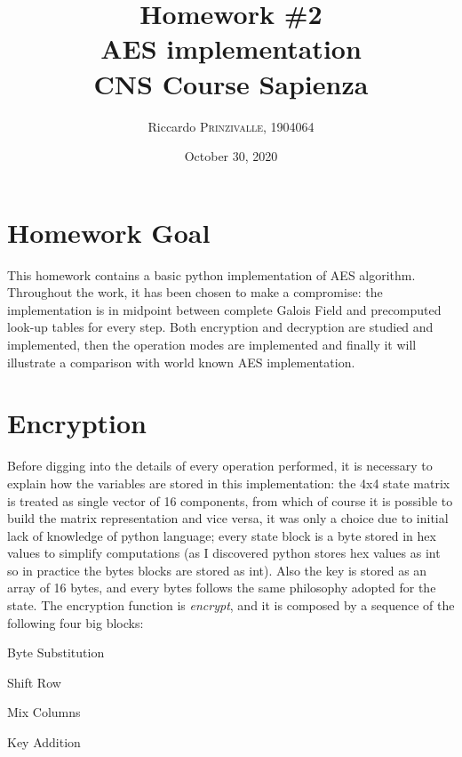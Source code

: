 \documentclass{article}
\title{Homework \#2 \\AES implementation \\[0.2em]\small{}CNS Course Sapienza} %
\author{Riccardo \textsc{Prinzivalle}, 1904064} %
\date{October 30, 2020} %
\begin{document}
\maketitle %


\section{Homework Goal}

This homework contains a basic python implementation of AES algorithm. Throughout the work, it has been chosen to make a compromise: the implementation is in midpoint between complete Galois Field and precomputed look-up tables for every step. Both encryption and decryption are studied and implemented, then the operation modes are implemented and finally it will illustrate a comparison with world known AES implementation.

\section{Encryption}
Before digging into the details of every operation performed, it is necessary to explain how the variables are stored in this implementation: the 4x4 state matrix is treated as single vector of 16 components, from which of course it is possible to build the matrix representation and vice versa, it was only a choice due to initial lack of knowledge of python language; every state block is a byte stored in hex values to simplify computations (as I discovered python stores hex values as int so in practice the bytes blocks are stored as int). Also the key is stored as an array of 16 bytes, and every bytes follows the same philosophy adopted for the state. \newline
The encryption function is \textit{encrypt}, and it is composed by a sequence of the following four big blocks:  

\begin{enumerate}
\begin{item}
Byte Substitution
\end{item}
\begin{item}
Shift Row 
\end{item}
\begin{item}
Mix Columns
\end{item}
\begin{item}
Key Addition 
\end{item}
\end{enumerate}
\end{document}
